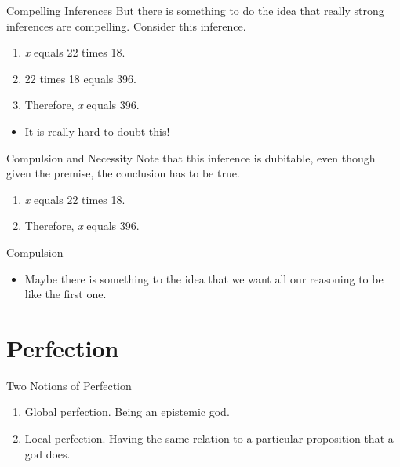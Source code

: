 \documentclass[
  17pt,
  letterpaper,
  ignorenonframetext,
  aspectratio=169,
  handout]{beamer}
\providecommand{\tightlist}{%
  \setlength{\itemsep}{0pt}\setlength{\parskip}{0pt}}\usepackage{longtable,booktabs,array}
\begin{document}
\begin{frame}{Compelling Inferences}
\protect\hypertarget{compelling-inferences}{}
But there is something to do the idea that really strong inferences are
compelling. Consider this inference.

\begin{enumerate}[<+->]
\tightlist
\item
  \emph{x} equals 22 times 18.
\item
  22 times 18 equals 396.
\item
  Therefore, \emph{x} equals 396.
\end{enumerate}

\begin{itemize}[<+->]
\tightlist
\item
  It is really hard to doubt this!
\end{itemize}
\end{frame}

\begin{frame}{Compulsion and Necessity}
\protect\hypertarget{compulsion-and-necessity}{}
Note that this inference is dubitable, even though given the premise,
the conclusion has to be true.

\begin{enumerate}[<+->]
\tightlist
\item
  \emph{x} equals 22 times 18.
\item
  Therefore, \emph{x} equals 396.
\end{enumerate}
\end{frame}

\begin{frame}{Compulsion}
\protect\hypertarget{compulsion-4}{}
\begin{itemize}[<+->]
\tightlist
\item
  Maybe there is something to the idea that we want all our reasoning to
  be like the first one.
\end{itemize}
\end{frame}

\hypertarget{perfection}{%
\section{Perfection}\label{perfection}}

\begin{frame}{Two Notions of Perfection}
\protect\hypertarget{two-notions-of-perfection}{}
\begin{enumerate}[<+->]
\tightlist
\item
  Global perfection. Being an epistemic god.
\item
  Local perfection. Having the same relation to a particular proposition
  that a god does.
\end{enumerate}
\end{frame}
\end{document}
